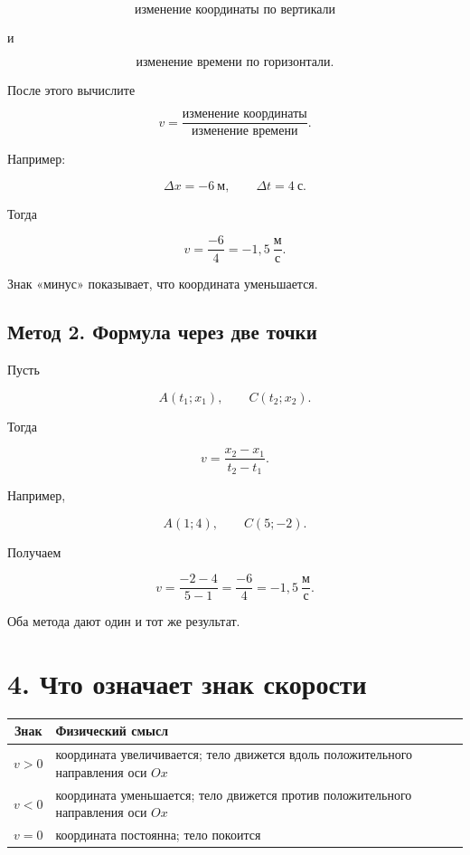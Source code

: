 \documentclass[a4paper,12pt]{article}
\begin{document}
\[
\text{изменение координаты по вертикали}
\]

и

\[
\text{изменение времени по горизонтали}.
\]

После этого вычислите

\[
v=
\frac{\text{изменение координаты}}
     {\text{изменение времени}}.
\]

Например:

\[
\Delta x=-6~\text{м},
\qquad
\Delta t=4~\text{с}.
\]

Тогда

\[
v=\frac{-6}{4}=-1{,}5~\frac{\text{м}}{\text{с}}.
\]

Знак «минус» показывает, что координата уменьшается.

\subsection{Метод 2. Формула через две точки}

Пусть

\[
A(t_1;x_1),
\qquad
C(t_2;x_2).
\]

Тогда

\[
v=\frac{x_2-x_1}{t_2-t_1}.
\]

Например,

\[
A(1;4),
\qquad
C(5;-2).
\]

Получаем

\[
v=
\frac{-2-4}{5-1}
=
\frac{-6}{4}
=
-1{,}5~\frac{\text{м}}{\text{с}}.
\]

Оба метода дают один и тот же результат.

\section{4. Что означает знак скорости}

\begin{center}
\begin{tabularx}{0.92\linewidth}{@{}c X@{}}
\toprule
\textbf{Знак} & \textbf{Физический смысл} \\
\midrule
\(v>0\) &
координата увеличивается; тело движется вдоль положительного направления оси \(Ox\) \\
\(v<0\) &
координата уменьшается; тело движется против положительного направления оси \(Ox\) \\
\(v=0\) &
координата постоянна; тело покоится \\
\bottomrule
\end{tabularx}
\end{center}
\end{document}
